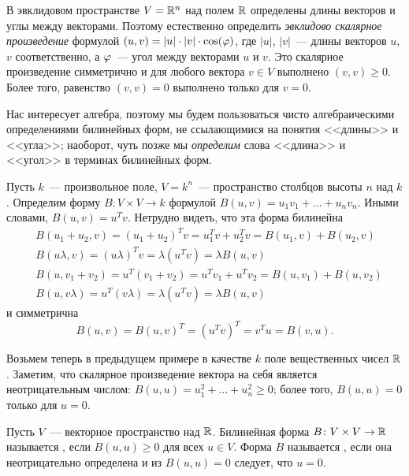 \begin{example}
В эвклидовом пространстве $V=\mathbb R^n$ над полем $\mathbb R$ определены
длины векторов и углы между векторами. Поэтому естественно определить
{\it эвклидово скалярное произведение} формулой $(u,v) = |u|\cdot
|v|\cdot\cos(\varphi)$, где $|u|$, $|v|$~--- длины векторов $u$, $v$
соответственно, а $\varphi$~--- угол между векторами $u$ и $v$.
Это скалярное произведение симметрично и для любого вектора $v\in V$
выполнено $(v,v)\geq 0$. Более того, равенство $(v,v)=0$ выполнено
только для $v=0$.
\end{example}

Нас интересует алгебра, поэтому мы будем пользоваться чисто
алгебраическими определениями билинейных форм, не ссылающимися на
понятия <<длины>> и <<угла>>; наоборот, чуть позже мы
{\it определим} слова <<длина>> и <<угол>> в терминах билинейных форм.

\begin{example}\label{example:standard_bilinear_form}
Пусть $k$~--- произвольное поле, $V=k^n$~--- пространство столбцов
высоты $n$ над $k$. Определим форму $B\colon V\times V\to k$ формулой
$B(u,v) = u_1v_1 + \dots + u_nv_n$. Иными словами, $B(u,v) = u^Tv$.
Нетрудно видеть, что эта форма билинейна
\begin{align*}
&B(u_1+u_2,v) = (u_1+u_2)^Tv = u_1^Tv + u_2^Tv = B(u_1,v) + B(u_2,v)\\
&B(u\lambda,v)=(u\lambda)^Tv=\lambda(u^Tv)=\lambda B(u,v)\\
&B(u,v_1+v_2) = u^T(v_1+v_2) = u^Tv_1 + u^Tv_2 = B(u,v_1) + B(u,v_2)\\
&B(u,v\lambda)=u^T(v\lambda)=\lambda(u^Tv)=\lambda B(u,v)
\end{align*}
и симметрична
$$
B(u,v) = B(u,v)^T = (u^Tv)^T = v^Tu = B(v,u).
$$
\end{example}

Возьмем теперь в предыдущем примере в качестве $k$ поле вещественных
чисел $\mathbb R$. Заметим, что скалярное произведение вектора на себя
является неотрицательным числом: $B(u,u) = u_1^2 + \dots + u_n^2\geq
0$; более того, $B(u,u) = 0$ только для $u=0$.

\begin{definition}
Пусть $V$~--- векторное пространство над $\mathbb R$. Билинейная форма
$B\colon V\times V\to\mathbb R$ называется , если
$B(u,u)\geq 0$ для всех $u\in V$. Форма $B$
называется , если она
неотрицательно определена и из $B(u,u)=0$ следует, что $u=0$.
\end{definition}

